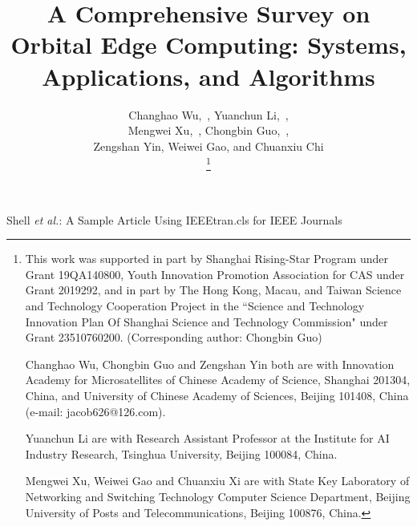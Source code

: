 \documentclass[lettersize,journal]{IEEEtran}
\begin{document}
\title{A Comprehensive Survey on Orbital Edge Computing: Systems, Applications, and Algorithms}

\author{Changhao Wu,~,
Yuanchun Li,~,

Mengwei Xu,~,
Chongbin Guo,~,

Zengshan Yin, Weiwei Gao, and Chuanxiu Chi


\thanks{
  This work was supported in part by Shanghai Rising-Star Program under Grant 19QA140800, Youth Innovation Promotion Association for CAS under Grant 2019292, and in part by The Hong Kong, Macau, and Taiwan Science and Technology Cooperation Project in the ``Science and Technology Innovation Plan Of Shanghai Science and Technology Commission" under Grant 23510760200. (Corresponding author: Chongbin Guo)
  


  Changhao Wu, Chongbin Guo and Zengshan Yin both are with Innovation Academy for Microsatellites of Chinese Academy of Science, Shanghai 201304, China, and University of Chinese Academy of Sciences, Beijing 101408, China (e-mail: jacob626@126.com). 

  Yuanchun Li are with Research Assistant Professor at the Institute for AI Industry Research, Tsinghua University, Beijing 100084, China.
  
  Mengwei Xu, Weiwei Gao and Chuanxiu Xi are with State Key Laboratory of Networking and Switching Technology Computer Science Department, Beijing University of Posts and Telecommunications, Beijing 100876, China. 

}%
}

\markboth{}%
{Shell \MakeLowercase{\textit{et al.}}: A Sample Article Using IEEEtran.cls for IEEE Journals}

\IEEEpubid{}

\maketitle
\end{document}
